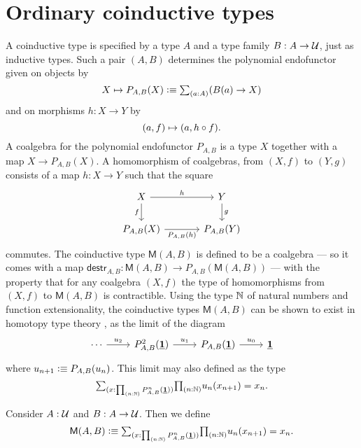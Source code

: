 \section{Ordinary coinductive types}
A coinductive type is specified by
a type $A$ and a type family $B:A\to\mathcal{U}$, just as inductive types. 
Such a pair $(A,B)$ determines the polynomial endofunctor given on objects by
\begin{equation*}
X \mapsto P_{A,B}(X)\defeq \sm{a:A} (B(a)\to X)
\end{equation*}
and on morphisms $h:X\to Y$ by
\begin{equation*}
{\mathopen{}(a,f)\mathclose{}}\mapsto {\mathopen{}(a,h\circ f)\mathclose{}}.
\end{equation*}
A coalgebra for the polynomial endofunctor $P_{A,B}$ is a type $X$ together
with a map $X\to P_{A,B}(X)$. A homomorphism of coalgebras, from $(X,f)$ to
$(Y,g)$ consists of a map $h:X\to Y$ such that the square
\begin{equation*}
\begin{tikzcd}[column sep=large]
X \arrow[r,"h"] \arrow[d,swap,"f"] & Y \arrow[d,"g"] \\
P_{A,B}(X) \arrow[r,swap,"P_{A,B}(h)"] & P_{A,B}(Y)
\end{tikzcd}
\end{equation*}
commutes. The coinductive type $\mathsf{M}(A,B)$ is defined to be a coalgebra
--- so it comes with a map $\mathsf{destr}_{A,B} : \mathsf{M}(A,B)\to P_{A,B}(\mathsf{M}(A,B))$ ---
with the property that for any coalgebra $(X,f)$ the type of homomorphisms
from $(X,f)$ to $\mathsf{M}(A,B)$ is contractible.
Using the type $\mathbb{N}$ of natural numbers and function extensionality, the coinductive types 
$\mathsf{M}(A,B)$ can be shown to exist in homotopy type theory
\cite{AhrensCapriottiSpadotti}, as the limit of the diagram
\begin{equation*}
\begin{tikzcd}
\cdots \arrow[r,"u_2"] & P^2_{A,B}(\unit) \arrow[r,"u_1"] & P_{A,B}(\unit) \arrow[r,"u_0"] & \unit
\end{tikzcd}
\end{equation*}
where $u_{n+1}\vcentcolon\equiv P_{A,B}(u_n)$.
This limit may also defined as the type
\begin{equation*}
\sm{x:\prd{n:\N} P^n_{A,B}(\unit)}\prd{n:\N} u_n(x_{n+1})=x_n.
\end{equation*}

\begin{defn}
Consider $A:\mathcal{U}$ and $B:A\to\mathcal{U}$. Then we define
\begin{equation*}
\mathsf{M}(A,B)\defeq \sm{x:\prd{n:\N} P^n_{A,B}(\unit)}\prd{n:\N} u_n(x_{n+1})=x_n.
\end{equation*}
\end{defn}

